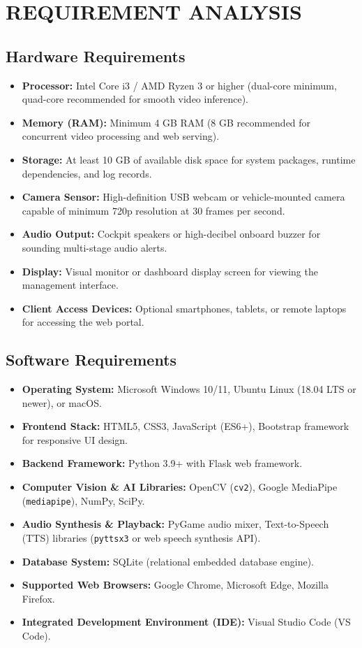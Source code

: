 \documentclass[a4paper,12pt]{report}
\begin{document}
\chapter{REQUIREMENT ANALYSIS}

\section{Hardware Requirements}
\begin{itemize}
    \item \textbf{Processor:} Intel Core i3 / AMD Ryzen 3 or higher (dual-core minimum, quad-core recommended for smooth video inference).
    \item \textbf{Memory (RAM):} Minimum 4 GB RAM (8 GB recommended for concurrent video processing and web serving).
    \item \textbf{Storage:} At least 10 GB of available disk space for system packages, runtime dependencies, and log records.
    \item \textbf{Camera Sensor:} High-definition USB webcam or vehicle-mounted camera capable of minimum 720p resolution at 30 frames per second.
    \item \textbf{Audio Output:} Cockpit speakers or high-decibel onboard buzzer for sounding multi-stage audio alerts.
    \item \textbf{Display:} Visual monitor or dashboard display screen for viewing the management interface.
    \item \textbf{Client Access Devices:} Optional smartphones, tablets, or remote laptops for accessing the web portal.
\end{itemize}

\section{Software Requirements}
\begin{itemize}
    \item \textbf{Operating System:} Microsoft Windows 10/11, Ubuntu Linux (18.04 LTS or newer), or macOS.
    \item \textbf{Frontend Stack:} HTML5, CSS3, JavaScript (ES6+), Bootstrap framework for responsive UI design.
    \item \textbf{Backend Framework:} Python 3.9+ with Flask web framework.
    \item \textbf{Computer Vision \& AI Libraries:} OpenCV (\texttt{cv2}), Google MediaPipe (\texttt{mediapipe}), NumPy, SciPy.
    \item \textbf{Audio Synthesis \& Playback:} PyGame audio mixer, Text-to-Speech (TTS) libraries (\texttt{pyttsx3} or web speech synthesis API).
    \item \textbf{Database System:} SQLite (relational embedded database engine).
    \item \textbf{Supported Web Browsers:} Google Chrome, Microsoft Edge, Mozilla Firefox.
    \item \textbf{Integrated Development Environment (IDE):} Visual Studio Code (VS Code).
\end{itemize}
\end{document}
